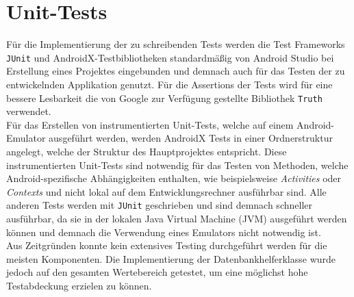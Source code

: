 \documentclass[oneside]{ausarbeitung}
\begin{document}
\section{Unit-Tests}
Für die Implementierung der zu schreibenden Tests werden die Test Frameworks \texttt{JUnit} und AndroidX-Testbibliotheken standardmäßig von Android Studio bei Erstellung eines Projektes eingebunden und demnach auch für das Testen der zu entwickelnden Applikation genutzt. Für die Assertions der Tests wird für eine bessere Lesbarkeit die von Google zur Verfügung gestellte Bibliothek \texttt{Truth} verwendet.\\
Für das Erstellen von instrumentierten Unit-Tests, welche auf einem Android-Emulator ausgeführt werden, werden AndroidX Tests in einer Ordnerstruktur angelegt, welche der Struktur des Hauptprojektes entspricht. Diese instrumentierten Unit-Tests sind notwendig für das Testen von Methoden, welche Android-spezifische Abhängigkeiten enthalten, wie beispielsweise \textit{Activities} oder \textit{Contexts} und nicht lokal auf dem Entwicklungsrechner ausführbar sind. Alle anderen Tests werden mit \texttt{JUnit} geschrieben und sind demnach schneller ausführbar, da sie in der lokalen Java Virtual Machine (JVM) ausgeführt werden können und demnach die Verwendung eines Emulators nicht notwendig ist.\\
Aus Zeitgründen konnte kein extensives Testing durchgeführt werden für die meisten Komponenten. Die Implementierung der Datenbankhelferklasse wurde jedoch auf den gesamten Wertebereich getestet, um eine möglichst hohe Testabdeckung erzielen zu können.\\
\end{document}
